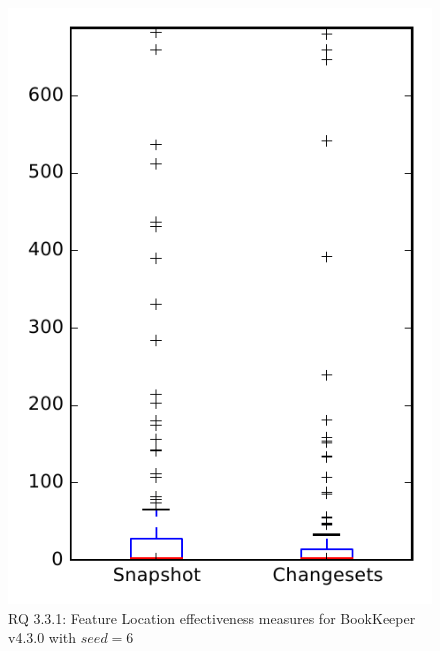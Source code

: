
\begin{figure}
\centering
\includegraphics[height=0.4\textheight]{figures/flt_seed/rq1_bookkeeper_6}
\caption{RQ 3.3.1: Feature Location effectiveness measures for BookKeeper v4.3.0 with $seed=6$}
\label{fig:flt_seed:rq1:bookkeeper}
\end{figure}
